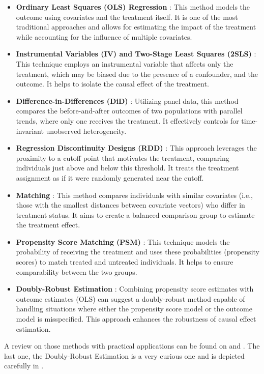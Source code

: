 \begin{itemize}
  \item \textbf{Ordinary Least Squares (OLS) Regression} : This method models the outcome using covariates and the treatment itself. It is one of the most traditional approaches and allows
   for estimating the impact of the treatment while accounting for the influence of multiple covariates.
  \item \textbf{Instrumental Variables (IV) and Two-Stage Least Squares (2SLS)} : This technique employs an instrumental variable that affects only the treatment, which may be biased due to 
  the presence of a confounder, and the outcome. It helps to isolate the causal effect of the treatment.
  \item \textbf{Difference-in-Differences (DiD)} : Utilizing panel data, this method compares the before-and-after outcomes of two populations with parallel trends, where only one receives the
   treatment. It effectively controls for time-invariant unobserved heterogeneity.
  \item \textbf{Regression Discontinuity Designs (RDD)} : This approach leverages the proximity to a cutoff point that motivates the treatment, comparing 
  individuals just above and below this threshold. It treats the treatment assignment as if it were randomly generated near the cutoff.
  \item \textbf{Matching} : This method compares individuals with similar covariates (i.e., those with the smallest distances between covariate vectors) who differ in treatment status. 
  It aims to create a balanced comparison group to estimate the treatment effect.
  \item \textbf{Propensity Score Matching (PSM)} : This technique models the probability of receiving the treatment and uses these probabilities (propensity scores) to match 
  treated and untreated individuals. It helps to ensure comparability between the two groups.
  \item \textbf{Doubly-Robust Estimation} : Combining propensity score estimates with outcome estimates (OLS) can suggest a doubly-robust method capable of handling situations where 
  either the propensity score model or the outcome model is misspecified. This approach enhances the robustness of causal effect estimation.
\end{itemize}

A review on those methods with practical applications can be found on \textcite{cunningham_causal_2021} and \textcite{morgan_counterfactuals_2015}. The last one, the Doubly-Robust Estimation is
a very curious one and is depicted carefully in \textcite{huber_causal_2023}.

